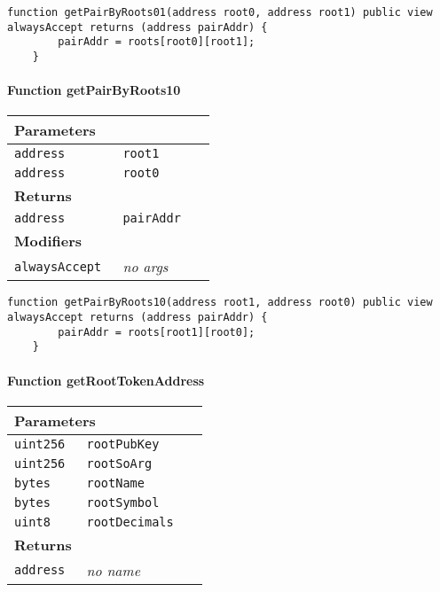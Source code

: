 \vspace{2cm}

\begin{lstlisting}[firstnumber=314]
	function getPairByRoots01(address root0, address root1) public view alwaysAccept returns (address pairAddr) {
		pairAddr = roots[root0][root1];
	}
\end{lstlisting}

\paragraph{Function getPairByRoots10}


\ifsoltables
\noindent\begin{tabular}{|l|l|p{5cm}|}\hline
\multicolumn{3}{|l|}{\bf Parameters}\\\hline
\tt address & \tt root1 &\\\hline
\tt address & \tt root0 &\\\hline
\multicolumn{3}{|l|}{\bf Returns}\\\hline
\tt address & \tt pairAddr &\\\hline
\multicolumn{3}{|l|}{\bf Modifiers}\\\hline
\tt alwaysAccept & {\em no args} &\\\hline
\end{tabular}
\fi

\vspace{2cm}

\begin{lstlisting}[firstnumber=318]
	function getPairByRoots10(address root1, address root0) public view alwaysAccept returns (address pairAddr) {
		pairAddr = roots[root1][root0];
	}
\end{lstlisting}

\paragraph{Function getRootTokenAddress}


\ifsoltables
\noindent\begin{tabular}{|l|l|p{5cm}|}\hline
\multicolumn{3}{|l|}{\bf Parameters}\\\hline
\tt uint256 & \tt rootPubKey &\\\hline
\tt uint256 & \tt rootSoArg &\\\hline
\tt bytes & \tt rootName &\\\hline
\tt bytes & \tt rootSymbol &\\\hline
\tt uint8 & \tt rootDecimals &\\\hline
\multicolumn{3}{|l|}{\bf Returns}\\\hline
\tt address & {\em no name} &\\\hline
\end{tabular}
\fi

